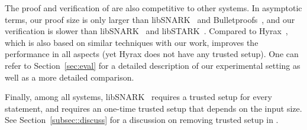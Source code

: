 The proof  and verification  of \name are also competitive to other systems. In asymptotic terms, our proof size is only larger than \textsf{libSNARK}~\cite{libsnark} and \textsf{Bulletproofs}~\cite{bulletproofs}, and our verification is slower than \textsf{libSNARK}~\cite{libsnark} and \textsf{libSTARK}~\cite{libstark}. Compared to \textsf{Hyrax}~\cite{hyrax}, which is also based on similar techniques with our work, \name improves the performance in all aspects (yet \textsf{Hyrax} does not have any trusted setup). One can refer to Section~\ref{sec:eval} for a detailed  description of our experimental setting as well as a more detailed comparison. 
 

 
Finally, among all systems, \textsf{libSNARK}~\cite{libsnark} requires a trusted setup for every statement, and \name requires an one-time trusted setup that depends on the input size. See Section~\ref{subsec::discuss} for a discussion on removing trusted setup in \name. 





